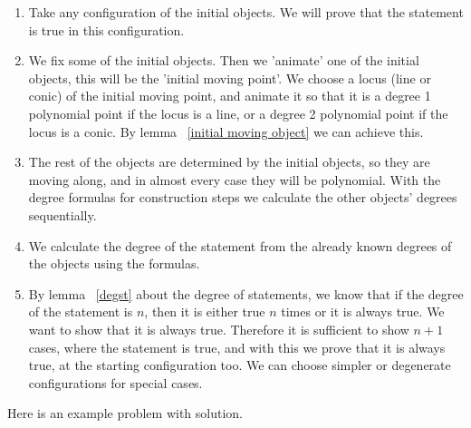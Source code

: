 \documentclass[a4paper]{article}
\begin{document}
\begin{enumerate}
    \item Take any configuration of the initial objects. We will prove that the statement is true in this configuration.
    \item We fix some of the initial objects. Then we 'animate' one of the initial objects, this will be the 'initial moving point'. We choose a locus (line or conic) of the initial moving point, and animate it so that it is a degree 1 polynomial point if the locus is a line, or a degree 2 polynomial point if the locus is a conic. By lemma ~\ref{initial moving object} we can achieve this.
    \item The rest of the objects are determined by the initial objects, so they are moving along, and in almost every case they will be polynomial. With the degree formulas for construction steps we calculate the other objects' degrees sequentially.
    \item We calculate the degree of the statement from the already known degrees of the objects using the formulas.
    \item By lemma ~\ref{degst} about the degree of statements, we know that if the degree of the statement is $n$, then it is either true $n$ times or it is always true. We want to show that it is always true. Therefore it is sufficient to show $n+1$ cases, where the statement is true, and with this we prove that it is always true, at the starting configuration too. We can choose simpler or degenerate configurations for special cases.
\end{enumerate}

Here is an example problem with solution.
\end{document}
